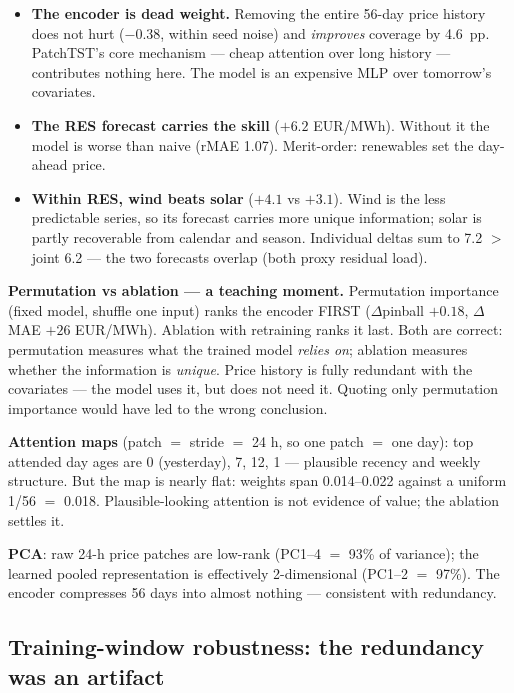\begin{itemize}
  \item \textbf{The encoder is dead weight.} Removing the entire 56-day
        price history does not hurt ($-0.38$, within seed noise) and
        \emph{improves} coverage by 4.6~pp. PatchTST's core mechanism ---
        cheap attention over long history --- contributes nothing here.
        The model is an expensive MLP over tomorrow's covariates.
  \item \textbf{The RES forecast carries the skill} ($+6.2$ EUR/MWh).
        Without it the model is worse than naive (rMAE 1.07).
        Merit-order: renewables set the day-ahead price.
  \item \textbf{Within RES, wind beats solar} ($+4.1$ vs $+3.1$).
        Wind is the less predictable series, so its forecast carries
        more unique information; solar is partly recoverable from
        calendar and season. Individual deltas sum to 7.2 $>$ joint
        6.2 --- the two forecasts overlap (both proxy residual load).
\end{itemize}

\textbf{Permutation vs ablation --- a teaching moment.} Permutation
importance (fixed model, shuffle one input) ranks the encoder FIRST
($\Delta$pinball $+0.18$, $\Delta$MAE $+26$ EUR/MWh). Ablation with
retraining ranks it last. Both are correct: permutation measures what
the trained model \emph{relies on}; ablation measures whether the
information is \emph{unique}. Price history is fully redundant with the
covariates --- the model uses it, but does not need it. Quoting only
permutation importance would have led to the wrong conclusion.

\textbf{Attention maps} (patch $=$ stride $=$ 24 h, so one patch $=$ one
day): top attended day ages are 0 (yesterday), 7, 12, 1 --- plausible
recency and weekly structure. But the map is nearly flat: weights span
0.014--0.022 against a uniform 1/56 $=$ 0.018. Plausible-looking
attention is not evidence of value; the ablation settles it.

\textbf{PCA}: raw 24-h price patches are low-rank (PC1--4 $=$ 93\% of
variance); the learned pooled representation is effectively
2-dimensional (PC1--2 $=$ 97\%). The encoder compresses 56 days into
almost nothing --- consistent with redundancy.

\subsection{Training-window robustness: the redundancy was an artifact}

